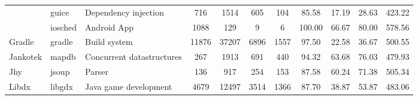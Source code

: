\begin{table*}[]
{\begin{tabular}{lllcccccccc}
                            & guice                                                         & Dependency injection                                                      & 716            & 1514            & 605                                                                   & 104            & 85.58          & 17.19          & 28.63          & 423.22                                               \\
                            & iosched                                                       & Android App                                                               & 1088           & 129             & 9                                                                     & 6              & 100.00         & 66.67          & 80.00          & 578.56                                               \\ \hline
Gradle                      & gradle                                                        & Build system                                                              & 11876          & 37207           & 6896                                                                  & 1557           & 97.50          & 22.58          & 36.67          & 500.55                                               \\ \hline
Jankotek                    & mapdb                                                         & Concurrent datastructures                                                 & 267            & 1913            & 691                                                                   & 440            & 94.32          & 63.68          & 76.03          & 479.93                                               \\ \hline
Jhy                         & jsoup                                                         & Parser                                                                    & 136            & 917             & 254                                                                   & 153            & 87.58          & 60.24          & 71.38          & 505.34                                               \\ \hline
Libdx                       & libgdx                                                        & Java game development                                                     & 4679           & 12497           & 3514                                                                  & 1366           & 87.70          & 38.87          & 53.87          & 483.06                                               \\ \hline

\end{tabular}}
\end{table*}
